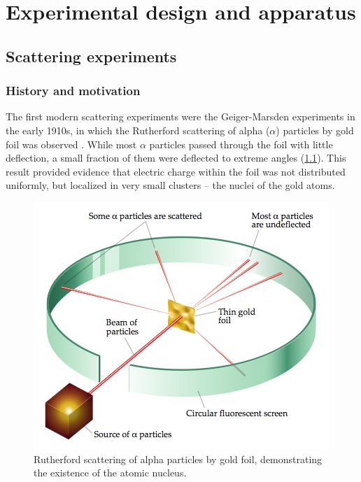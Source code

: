\chapter{Experimental design and apparatus}
\label{ch:experiment}
\graphicspath{{Chapter-Experiment/figures/}}

\section{Scattering experiments}

\subsection{History and motivation}
The first modern scattering experiments were the Geiger-Marsden experiments in the early 1910s, in which the Rutherford scattering of alpha ($\alpha$) particles by gold foil was observed \cite{Rutherford:1911zz}.
While most $\alpha$ particles passed through the foil with little deflection, a small fraction of them were deflected to extreme angles (\cref{fig:rutherford}).
This result provided evidence that electric charge within the foil was not distributed uniformly, but localized in very small clusters -- the nuclei of the gold atoms.
\begin{figure}[t]
  \includegraphics{BLB-1070873-Rutherford_v2.jpg}
  \caption{Rutherford scattering of alpha particles by gold foil, demonstrating the existence of the atomic nucleus.}
  \label{fig:rutherford}
\end{figure}

